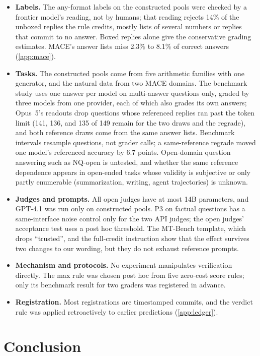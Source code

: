 \documentclass{article}
\begin{document}
\begin{itemize}[leftmargin=1.2em,itemsep=1pt,topsep=2pt]
\item \textbf{Labels.} The any-format labels on the constructed pools were checked by a frontier model's reading, not by humans; that reading rejects 14\% of the unboxed replies the rule credits, mostly lists of several numbers or replies that commit to no answer. Boxed replies alone give the conservative grading estimates. \textsc{MACE}'s answer lists miss 2.3\% to 8.1\% of correct answers (\cref{app:mace}).
\item \textbf{Tasks.} The constructed pools come from five arithmetic families with one generator, and the natural data from two \textsc{MACE} domains. The benchmark study uses one answer per model on multi-answer questions only, graded by three models from one provider, each of which also grades its own answers; Opus~5's readouts drop questions whose referenced replies ran past the token limit (141, 136, and 135 of 149 remain for the two draws and the regrade), and both reference draws come from the same answer lists. Benchmark intervals resample questions, not grader calls; a same-reference regrade moved one model's referenced accuracy by 6.7 points. Open-domain question answering such as NQ-open is untested, and whether the same reference dependence appears in open-ended tasks whose validity is subjective or only partly enumerable (summarization, writing, agent trajectories) is unknown.
\item \textbf{Judges and prompts.} All open judges have at most 14B parameters, and GPT-4.1 was run only on constructed pools. P3 on factual questions has a same-interface noise control only for the two API judges; the open judges' acceptance test uses a post hoc threshold. The MT-Bench template, which drops ``trusted'', and the full-credit instruction show that the effect survives two changes to our wording, but they do not exhaust reference prompts.
\item \textbf{Mechanism and protocols.} No experiment manipulates verification directly. The max rule was chosen post hoc from five zero-cost score rules; only its benchmark result for two graders was registered in advance.
\item \textbf{Registration.} Most registrations are timestamped commits, and the verdict rule was applied retroactively to earlier predictions (\cref{app:ledger}).
\end{itemize}

\section{Conclusion}
\label{sec:conclusion}
\end{document}
